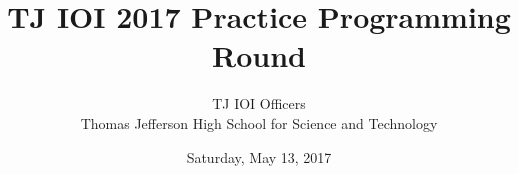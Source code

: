 \documentclass[twoside]{article}
\begin{document}
\title{\LARGE TJ IOI 2017 Practice Programming Round}

\author{
	\large
	TJ IOI Officers \\
	\vspace{0.5em}
	Thomas Jefferson High School for Science and Technology
}
\date{\large Saturday, May 13, 2017}


\begin{titlepage}
    \maketitle
\end{titlepage}

\blankpage



\newpage

\tableofcontents
\newpage






\cleardoublepage



\cleardoublepage



\cleardoublepage
\end{document}
